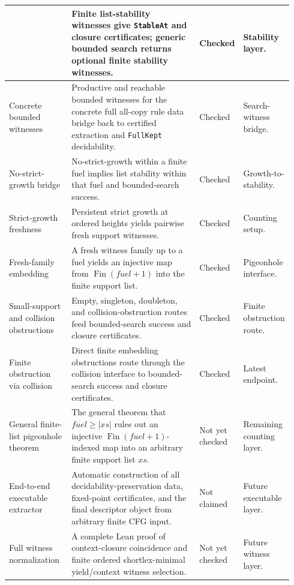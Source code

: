 \documentclass[sub]{jalc}
\begin{document}
\begin{table}[p]
\begin{tabular}{p{0.22\linewidth}p{0.45\linewidth}p{0.13\linewidth}p{0.14\linewidth}}
& Finite list-stability witnesses give \texttt{StableAt} and closure certificates; generic bounded search returns optional finite stability witnesses.
& Checked
& Stability layer.\\
\hline
Concrete bounded witnesses
& Productive and reachable bounded witnesses for the concrete full all-copy rule data bridge back to certified extraction and \texttt{FullKept} decidability.
& Checked
& Search-witness bridge.\\
\hline
No-strict-growth bridge
& No-strict-growth within a finite fuel implies list stability within that fuel and bounded-search success.
& Checked
& Growth-to-stability.\\
\hline
Strict-growth freshness
& Persistent strict growth at ordered heights yields pairwise fresh support witnesses.
& Checked
& Counting setup.\\
\hline
Fresh-family embedding
& A fresh witness family up to a fuel yields an injective map from \(\operatorname{Fin}(fuel+1)\) into the finite support list.
& Checked
& Pigeonhole interface.\\
\hline
Small-support and collision obstructions
& Empty, singleton, doubleton, and collision-obstruction routes feed bounded-search success and closure certificates.
& Checked
& Finite obstruction route.\\
\hline
Finite obstruction via collision
& Direct finite embedding obstructions route through the collision interface to bounded-search success and closure certificates.
& Checked
& Latest endpoint.\\
\hline
General finite-list pigeonhole theorem
& The general theorem that \(fuel\ge |xs|\) rules out an injective \(\operatorname{Fin}(fuel+1)\)-indexed map into an arbitrary finite support list \(xs\).
& Not yet checked
& Remaining counting layer.\\
\hline
End-to-end executable extractor
& Automatic construction of all decidability-preservation data, fixed-point certificates, and the final descriptor object from arbitrary finite CFG input.
& Not claimed
& Future executable layer.\\
\hline
Full witness normalization
& A complete Lean proof of context-closure coincidence and finite ordered shortlex-minimal yield/context witness selection.
& Not yet checked
& Future witness layer.\\
\hline
\end{tabular}
\end{table}
\end{document}
